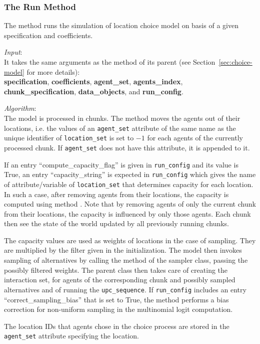 %
\subsubsection{The Run Method}
%
The  method runs the simulation of location choice model on basis
of a given specification and coefficients.

{\it Input}:\\[1mm]
It takes the same arguments as the  method of its parent (see
Section~\ref{sec:choice-model} for more details): \\
{\bf specification}, {\bf coefficients}, {\bf agent_set}, {\bf agents_index},
{\bf chunk_specification}, {\bf data_objects}, and {\bf run_config}.

{\it Algorithm}:\\[1mm]
The model is processed in chunks. The  method moves
the agents out of their locations, i.e. the values of an
\verb|agent_set| attribute of the same name as the unique identifier of
\verb|location_set| is set to $-1$ for each agents of the currently processed
chunk. If \verb|agent_set| does not have this attribute, it is appended to it.

If an entry ``compute_capacity_flag'' is given in \verb|run_config| and its
value is True, an entry ``capacity_string'' is expected in \verb|run_config|
which gives the name of attribute/variable of \verb|location_set| that
determines capacity for each location. In such a case, after removing agents
from their locations, the capacity is computed using method
. Note that by removing agents of only the
current chunk from their locations, the capacity is influenced by only those
agents. Each chunk then see the state of the world updated by all previously
running chunks.

The capacity values are used as weights of locations in the case of sampling.
They are multiplied by the filter given in the initialization.  The
model then invokes sampling of alternatives by calling the
 method of the sampler class, passing the possibly filtered
weights. The parent class then takes care of creating the interaction set, for
agents of the corresponding chunk and possibly sampled alternatives and of
running the \verb|upc_sequence|. If \verb|run_config| includes an entry
``correct_sampling_bias'' that is set to True, the method performs a bias
correction for non-uniform sampling in the multinomial logit computation.

The location IDs that agents chose in the choice process are stored
in the \verb|agent_set| attribute specifying the location.

